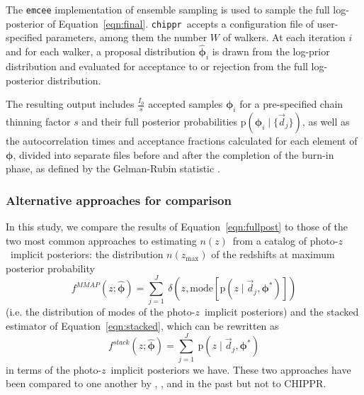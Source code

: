 \documentclass[iop]{emulateapj}
\newcommand{\Sect}[1]{Section~\ref{#1}}
\newcommand{\Eq}[1]{Equation~\ref{#1}}
\newcommand{\project}[1]{\textsc{#1}}
\newcommand{\Chippr}{\project{CHIPPR}}%
\newcommand{\repo}[1]{\texttt{#1}}
\newcommand{\chippr}{\repo{chippr}}
\newcommand{\emcee}{\repo{emcee}}
\newcommand{\python}{\textit{Python}}%
\newcommand{\data}{\ensuremath{\vec{d}}}%
\newcommand{\pr}[1]{\ensuremath{\mathrm{p}(#1)}}%
\newcommand{\gvn}{\mid}%
\newcommand{\pz}{photo-$z$}
\newcommand{\pzip}{\pz\ implicit posterior}
\newcommand{\nz}{$n(z)$}
\newcommand{\bvec}[1]{\ensuremath{\boldsymbol{#1}}}%
\newcommand{\ndphi}{\bvec{\phi}}
\begin{document}
The \emcee \citep{foreman-mackey_emcee_2013} implementation of ensemble sampling is used to sample the full log-posterior of \Eq{eqn:final}.
\chippr\ accepts a configuration file of user-specified parameters, among them the number $W$ of walkers.
At each iteration $i$ and for each walker, a proposal distribution $\hat{\ndphi}_{i}$ is drawn from the log-prior distribution and evaluated for acceptance to or rejection from the full log-posterior distribution.

The resulting output
includes $\frac{I_{0}}{s}$ accepted samples $\ndphi_{i}$ for a pre-specified chain thinning factor $s$ and their full posterior probabilities $\pr{\ndphi_{i} \gvn \{\data_{j}\}}$, as well as the autocorrelation times and acceptance fractions calculated for each element of $\ndphi$, divided into separate files before and after the completion of the burn-in phase, as defined by the Gelman-Rubin statistic \citep{gelman_inference_1992}.

\subsubsection{Alternative approaches for comparison}
\label{sec:sheldon}

In this study, we compare the results of \Eq{eqn:fullpost} to those of the two most common approaches to estimating \nz\ from a catalog of \pzip s:
the distribution $n(z_{\mathrm{max}})$ of the redshifts at maximum posterior probability
\begin{equation}
\label{eqn:mmap}
f^{MMAP}(z; \hat{\ndphi}) = \sum_{j=1}^{J}\ \delta(z, \mathrm{mode}[\pr{z \gvn \data_{j}, \ndphi^{*}}])
\end{equation}
(i.e. the distribution of modes of the \pzip s) and the stacked estimator of \Eq{eqn:stacked}, which can be rewritten as
\begin{equation}
\label{eqn:stacked}
f^{stack}(z; \hat{\ndphi}) = \sum_{j=1}^{J}\ \pr{z \gvn \data_{j}, \ndphi^{*}}
\end{equation}
in terms of the \pzip s we have.
These two approaches have been compared to one another by \citet{hildebrandt_cfhtlens:_2012}, \citet{benjamin_cfhtlens_2013}, and \citet{asorey_galaxy_2016} in the past but not to \Chippr.
\end{document}

